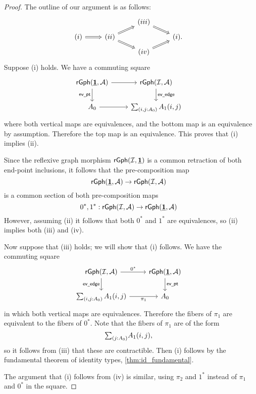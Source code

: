 \begin{proof}
The outline of our argument is as follows:
\begin{equation*}
\begin{tikzcd}[row sep=tiny]
& & (iii) \arrow[dr,Rightarrow] \\
(i) \arrow[r,Rightarrow] & (ii) \arrow[ur,Rightarrow] \arrow[dr,Rightarrow] & & (i). \\
& & (iv) \arrow[ur,Rightarrow]
\end{tikzcd}
\end{equation*}
Suppose (i) holds. We have a commuting square
\begin{equation*}
\begin{tikzcd}
\mathsf{rGph}(\unit,\mathcal{A}) \arrow[d,swap,"\mathsf{ev\usc{}pt}"] \arrow[r] & \mathsf{rGph}(\mathcal{I},\mathcal{A}) \arrow[d,"\mathsf{ev\usc{}edge}"] \\
\pts{A} \arrow[r] & \sm{i,j:\pts{A}}\edg{A}(i,j)
\end{tikzcd}
\end{equation*}
where both vertical maps are equivalences, and the bottom map is an equivalence by assumption. Therefore the top map is an equivalence. This proves that (i) implies (ii).

Since the reflexive graph morphism $\mathsf{rGph}(\mathcal{I},\underline{\mathbf{1}})$ is a common retraction of both end-point inclusions, it follows that the pre-composition map
\begin{equation*}
\mathsf{rGph}(\underline{\mathbf{1}},\mathcal{A}) \to \mathsf{rGph}(\mathcal{I},\mathcal{A})
\end{equation*}
is a common section of both pre-composition maps
\begin{equation*}
0^\ast,1^\ast:\mathsf{rGph}(\mathcal{I},\mathcal{A})\to \mathsf{rGph}(\underline{\mathbf{1}},\mathcal{A})
\end{equation*}
However, assuming (ii) it follows that both $0^\ast$ and $1^\ast$ are equivalences, so (ii) implies both (iii) and (iv).

Now suppose that (iii) holds; we will show that (i) follows. We have the commuting square
\begin{equation*}
\begin{tikzcd}
\mathsf{rGph}(\mathcal{I},\mathcal{A}) \arrow[d,swap,"\mathsf{ev\usc{}edge}"] \arrow[r,"0^\ast"] & \mathsf{rGph}(\unit,\mathcal{A}) \arrow[d,"\mathsf{ev\usc{}pt}"] \\
\sm{i,j:\pts{A}}\edg{A}(i,j) \arrow[r,swap,"\pi_1"] & \pts{A}
\end{tikzcd}
\end{equation*}
in which both vertical maps are equivalences. Therefore the fibers of $\pi_1$ are equivalent to the fibers of $0^\ast$. Note that the fibers of $\pi_1$ are of the form
\begin{equation*}
\sm{j:\pts{A}}\edg{A}(i,j),
\end{equation*}
so it follows from (iii) that these are contractible. Then (i) follows by the fundamental theorem of identity types, \cref{thm:id_fundamental}.

The argument that (i) follows from (iv) is similar, using $\pi_2$ and $1^\ast$ instead of $\pi_1$ and $0^\ast$ in the square.
\end{proof}

